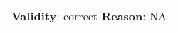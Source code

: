 \begin{figure*}[ht]
{\begin{tabular}{p{}}
            \textbf{Validity}: correct \textbf{Reason}: NA                                                                                                                                                                                                                                                                                                                                                                                                                                                                                                                                                                                                                                                                                                                                                                                                                                                                                                                                                                                                                                                                                                                                                                                                                                                                                                                                                                                                                                                                                                                                                                                                                                                                                                                                                                                                                                                                                                                                                          \\

\end{tabular}}
\end{figure*}
